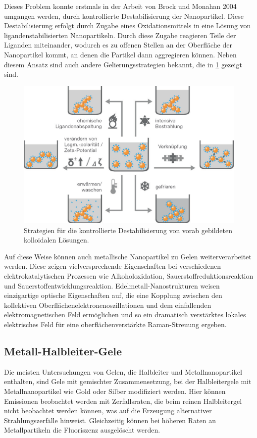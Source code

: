     Dieses Problem konnte erstmals in der Arbeit von Brock und Monahan 2004 umgangen werden, durch kontrollierte Destabilisierung der Nanopartikel. \autocite{Mohanan2004,Mohanan2005}
    Diese Destabilisierung erfolgt durch Zugabe eines Oxidationsmittels in eine Lösung von ligandenstabilisierten Nanopartikeln.
    Durch diese Zugabe reagieren Teile der Liganden miteinander, wodurch es zu offenen Stellen an der Oberfläche der Nanopartikel kommt, an denen die Partikel dann aggregieren können.
    Neben diesem Ansatz sind auch andere Gelierungsstrategien bekannt, die in \cref{fig:Destabilisierung} gezeigt sind.
    
    \begin{figure}[H]
        \centering
        \includegraphics[width=0.6\linewidth]{Bilder/Gelierung.png}
        \caption{Strategien für die kontrollierte Destabilisierung von vorab gebildeten kolloidalen Lösungen.\autocite{Aleman2007}}
        \label{fig:Destabilisierung}
    \end{figure}
    
    Auf diese Weise können auch metallische Nanopartikel zu Gelen weiterverarbeitet werden. \autocite{Bigall2009}
    Diese zeigen vielversprechende Eigenschaften bei verschiedenen elektrokatalytischen Prozessen wie Alkoholoxidation, Sauerstoffreduktionsreaktion und Sauerstoffentwicklungsreaktion. \autocite{Cai2018,Shi2018,Zhu2016,Shi2017,Wang2019}
    Edelmetall-Nanostrukturen weisen einzigartige optische Eigenschaften auf, die eine Kopplung zwischen den kollektiven Oberflächenelektronenoszillationen und dem einfallenden elektromagnetischen Feld ermöglichen und so ein dramatisch verstärktes lokales elektrisches Feld für eine oberflächenverstärkte Raman-Streuung ergeben. \autocite{Linic2015,Gao2016}

    
    \subsection{Metall-Halbleiter-Gele}
    Die meisten Untersuchungen von Gelen, die Halbleiter und Metallnanopartikel enthalten, sind Gele mit gemischter Zusammensetzung, bei der Halbleitergele mit Metallnanopartikel wie Gold oder Silber modifiziert werden.\autocite{Nahar2015,Lesnyak2011} 
    Hier können Emissionen beobachtet werden mit Zerfallsraten,  die beim reinen Halbleitergel nicht beobachtet werden können, was auf die Erzeugung alternativer Strahlungszerfälle hinweist. \autocite{Nahar2015}
    Gleichzeitig können bei höheren Raten an Metallpartikeln die Fluoriszenz ausgelöscht werden. \autocite{Lesnyak2011}